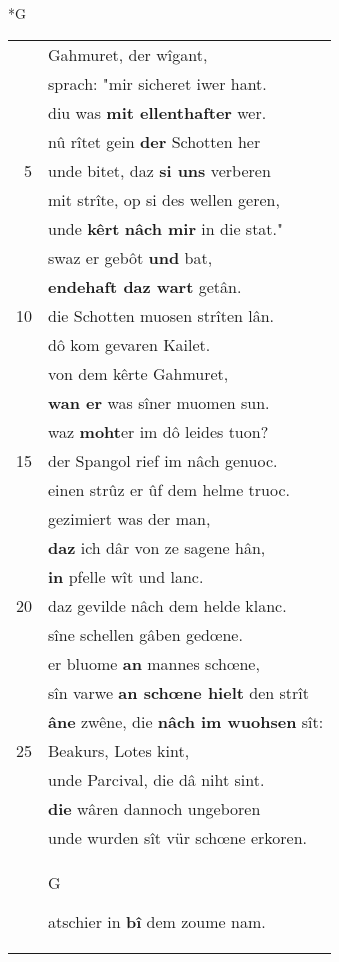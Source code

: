 \documentclass[8pt,a4paper,notitlepage]{article}
\begin{document}
\newpage
\begin{table}[ht]
\begin{minipage}[t]{0.5\linewidth}
\small
\begin{center}*G
\end{center}
\begin{tabular}{rl}
 & Gahmuret, der wîgant,\\ 
 & sprach: "mir sicheret iwer hant.\\ 
 & diu was \textbf{mit ellenthafter} wer.\\ 
 & nû rîtet gein \textbf{der} Schotten her\\ 
5 & unde bitet, daz \textbf{si uns} verberen\\ 
 & mit strîte, op si des wellen geren,\\ 
 & unde \textbf{kêrt} \textbf{nâch mir} in die stat."\\ 
 & swaz er gebôt \textbf{und} bat,\\ 
 & \textbf{endehaft daz wart} getân.\\ 
10 & die Schotten muosen strîten lân.\\ 
 & dô kom gevaren Kailet.\\ 
 & von dem kêrte Gahmuret,\\ 
 & \textbf{wan er} was sîner muomen sun.\\ 
 & waz \textbf{moht}er im dô leides tuon?\\ 
15 & der Spangol rief im nâch genuoc.\\ 
 & einen strûz er ûf dem helme truoc.\\ 
 & gezimiert was der man,\\ 
 & \textbf{daz} ich dâr von ze sagene hân,\\ 
 & \textbf{in} pfelle wît und lanc.\\ 
20 & daz gevilde nâch dem helde klanc.\\ 
 & sîne schellen gâben gedœne.\\ 
 & er bluome \textbf{an} mannes schœne,\\ 
 & sîn varwe \textbf{an schœne hielt} den strît\\ 
 & \textbf{âne} zwêne, die \textbf{nâch im wuohsen} sît:\\ 
25 & Beakurs, Lotes kint,\\ 
 & unde Parcival, die dâ niht sint.\\ 
 & \textbf{die} wâren dannoch ungeboren\\ 
 & unde wurden sît vür schœne erkoren.\\ 
 & \begin{large}G\end{large}atschier in \textbf{bî} dem zoume nam.\\ 

\end{tabular}
\end{minipage}
\end{table}
\end{document}
